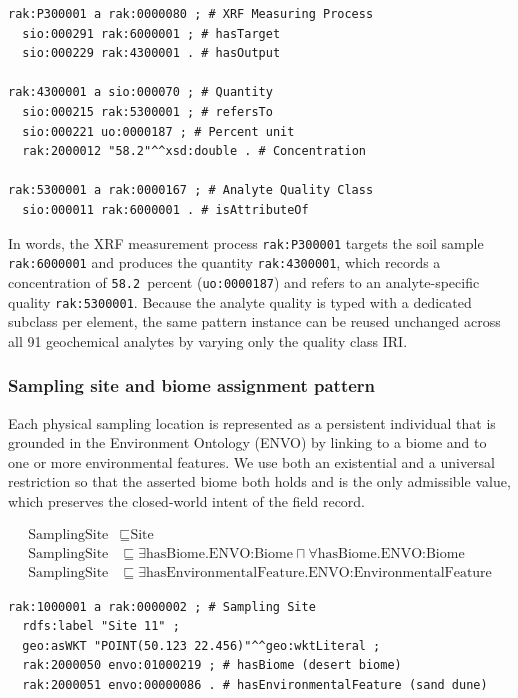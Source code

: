 \documentclass[11pt,a4paper]{article}
\begin{document}
\begin{lstlisting}[caption={Turtle representation of an XRF
  geochemistry measurement.},
  label={lst:ttl_xrf}, basicstyle=\ttfamily\scriptsize, frame=single]
rak:P300001 a rak:0000080 ; # XRF Measuring Process
  sio:000291 rak:6000001 ; # hasTarget
  sio:000229 rak:4300001 . # hasOutput

rak:4300001 a sio:000070 ; # Quantity
  sio:000215 rak:5300001 ; # refersTo
  sio:000221 uo:0000187 ; # Percent unit
  rak:2000012 "58.2"^^xsd:double . # Concentration

rak:5300001 a rak:0000167 ; # Analyte Quality Class
  sio:000011 rak:6000001 . # isAttributeOf
\end{lstlisting}

In words, the XRF measurement process \texttt{rak:P300001} targets
the soil sample \texttt{rak:6000001} and produces the quantity
\texttt{rak:4300001}, which records a concentration of
\texttt{58.2}~percent (\texttt{uo:0000187}) and refers to an
analyte-specific quality \texttt{rak:5300001}. Because the analyte
quality is typed with a dedicated subclass per element, the same
pattern instance can be reused unchanged across all 91 geochemical
analytes by varying only the quality class IRI.

\subsubsection{Sampling site and biome assignment pattern}

Each physical sampling location is represented as a persistent
individual that is grounded in the Environment Ontology (ENVO) by
linking to a biome and to one or more environmental features. We use
both an existential and a universal restriction so that the asserted
biome both holds and is the only admissible value, which preserves
the closed-world intent of the field record.

\begin{align}
    \label{eq:site}
    \text{SamplingSite} & \sqsubseteq \text{Site} \\
    \text{SamplingSite} & \sqsubseteq \exists
        \text{hasBiome}.\text{ENVO:Biome} \sqcap \forall
        \text{hasBiome}.\text{ENVO:Biome} \\
    \text{SamplingSite} & \sqsubseteq \exists
        \text{hasEnvironmentalFeature}.\text{ENVO:EnvironmentalFeature}
\end{align}

\begin{lstlisting}[caption={Turtle representation of a sampling site
  grounded in ENVO.},
  label={lst:ttl_site}, basicstyle=\ttfamily\scriptsize, frame=single]
rak:1000001 a rak:0000002 ; # Sampling Site
  rdfs:label "Site 11" ;
  geo:asWKT "POINT(50.123 22.456)"^^geo:wktLiteral ;
  rak:2000050 envo:01000219 ; # hasBiome (desert biome)
  rak:2000051 envo:00000086 . # hasEnvironmentalFeature (sand dune)
\end{lstlisting}
\end{document}
